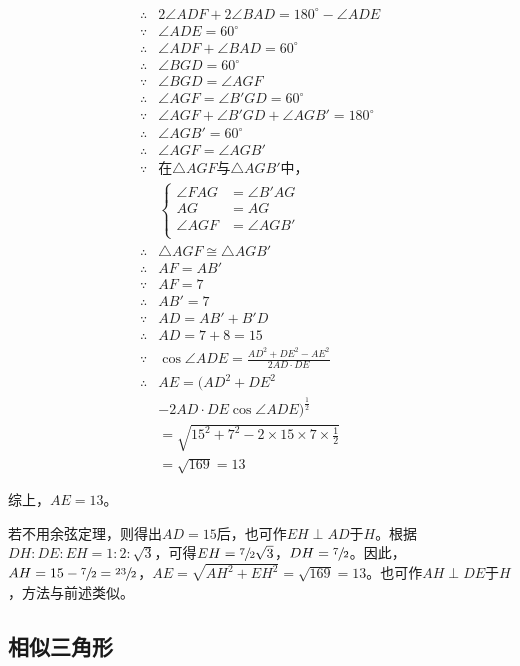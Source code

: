 \begin{align*}
  \therefore{}& 2\angle ADF + 2\angle BAD = 180^\circ - \angle ADE \\
  \because  {}& \angle ADE = 60^\circ \\
  \therefore{}& \angle ADF + \angle BAD = 60^\circ \\
  \therefore{}& \angle BGD = 60^\circ \\
  \because  {}& \angle BGD = \angle AGF \\
  \therefore{}& \angle AGF = \angle B'GD = 60^\circ \\
  \because  {}& \angle AGF + \angle B'GD + \angle AGB' = 180^\circ \\
  \therefore{}& \angle AGB' = 60^\circ \\
  \therefore{}& \angle AGF = \angle AGB' \\
  \because  {}& \text{在$\triangle AGF$与$\triangle AGB'$中，} \\
  &\left\{ \begin{aligned}
    \angle FAG &= \angle B'AG \\ AG &= AG \\ \angle AGF &= \angle AGB' \\
  \end{aligned} \right. \\
  \therefore{}& \triangle AGF \cong \triangle AGB' \\
  \therefore{}& AF = AB' \\
  \because  {}& AF = 7 \\
  \therefore{}& AB' = 7 \\
  \because  {}& AD = AB' + B'D \\
  \therefore{}& AD = 7 + 8 = 15 \\
  \because  {}& \cos\angle ADE = \frac{AD^2 + DE^2 - AE^2}{2AD\cdot DE} \\
  \therefore{}& AE = (AD^2 + DE^2 \\
  & - 2AD\cdot DE\cos\angle ADE)^\frac12 \\
  & = \sqrt{15^2 + 7^2 - 2\times15\times7\times\frac12} \\
  & = \sqrt{169} = 13
\end{align*}

综上，$AE = 13$。

若不用余弦定理，则得出$AD = 15$后，也可作$EH \perp AD$于$H$。根据$DH:DE:EH = 1:2:\sqrt3$，可得$EH = \sfrac72\sqrt3$，$DH = \sfrac72$。因此，$AH = 15 - \sfrac72 = \sfrac{23}2$，$AE = \sqrt{AH^2 + EH^2} = \sqrt{169} = 13$。也可作$AH \perp DE$于$H$，方法与前述类似。

\subsection{相似三角形} \label{subsec:000A-sim}

